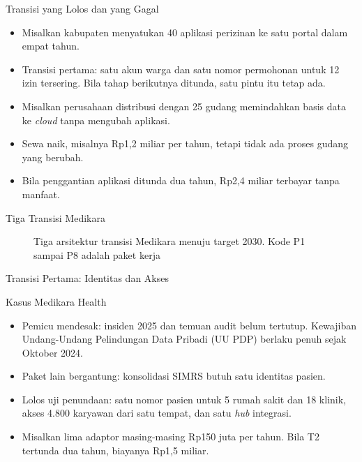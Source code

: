 \documentclass[aspectratio=169, table, 12pt]{beamer}
\begin{document}
\begin{frame}{{\Large Transisi yang Lolos dan yang Gagal}}
  \small
  \vspace{6pt}
  \begin{itemize}
    \item Misalkan kabupaten menyatukan 40 aplikasi perizinan ke satu portal dalam empat tahun.
    \item Transisi pertama: satu akun warga dan satu nomor permohonan untuk 12 izin tersering. Bila
          tahap berikutnya ditunda, satu pintu itu tetap ada.
    \item Misalkan perusahaan distribusi dengan 25 gudang memindahkan basis data ke \textit{cloud} tanpa
          mengubah aplikasi.
    \item Sewa naik, misalnya Rp1,2 miliar per tahun, tetapi tidak ada proses gudang yang berubah.
    \item Bila penggantian aplikasi ditunda dua tahun, Rp2,4 miliar terbayar tanpa manfaat.
  \end{itemize}
\end{frame}

\begin{frame}{{\Large Tiga Transisi Medikara}}
  \centering
  \begin{figure}
    \resizebox{0.94\textwidth}{!}{}
    \caption{Tiga arsitektur transisi Medikara menuju target 2030. Kode P1 sampai P8 adalah paket
             kerja}
  \end{figure}
\end{frame}

\begin{frame}{{\Large Transisi Pertama: Identitas dan Akses}}
  \begin{block}{Kasus Medikara Health}
    \small
    \begin{itemize}
      \item Pemicu mendesak: insiden 2025 dan temuan audit belum tertutup. Kewajiban Undang-Undang
            Pelindungan Data Pribadi (UU PDP) berlaku penuh sejak Oktober 2024.
      \item Paket lain bergantung: konsolidasi SIMRS butuh satu identitas pasien.
      \item Lolos uji penundaan: satu nomor pasien untuk 5 rumah sakit dan 18 klinik, akses 4.800
            karyawan dari satu tempat, dan satu \textit{hub} integrasi.
      \item Misalkan lima adaptor masing-masing Rp150 juta per tahun. Bila T2 tertunda dua tahun,
            biayanya Rp1,5 miliar.
    \end{itemize}
  \end{block}
\end{frame}
\end{document}
